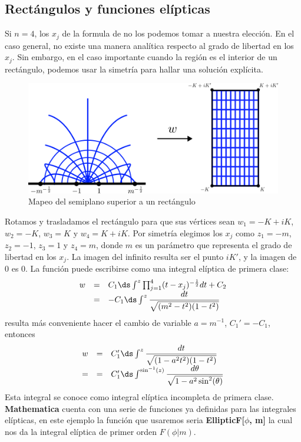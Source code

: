 \subsection{Rectángulos y funciones elípticas}
Si $n = 4$, los $x_j$ de la formula de \SC no los podemos tomar a nuestra elección. En el caso general, no existe una manera analítica respecto al grado de libertad en los $x_j$. Sin embargo, en el caso importante cuando la región es el interior de un rectángulo, podemos usar la  simetría para hallar una solución explícita.
\begin{figure}[h!]
	\centering
	\includegraphics[width=0.72\linewidth]{img/SCR}
	\caption{Mapeo del semiplano superior a un rectángulo}
	\label{fig:scr}
\end{figure}
Rotamos y trasladamos el rectángulo para que sus vértices sean $w_1=-K+iK$, $w_2=-K$, $w_3=K$ y $w_4=K+iK$. Por simetría elegimos los $x_j$ como $z_1 = -m$, 
$z_2 = -1$, $z_3 = 1$ y $z_4 = m$,  donde $m$ es un parámetro que representa el grado de libertad en los $x_j$. La imagen del infinito resulta ser  el punto $iK'$, y la imagen de $0$ es $0$. La función puede escribirse como una integral elíptica de primera clase:
\[
	\begin{array}{ccl}
		w&=&C_1\ds\int_{}^{z}\prod_{j=1}^{4}(t-x_j)^{-\frac{1}{2}}dt+C_2\\
		&=&-C_1\ds\int_{}^{z}\dfrac{dt}{\sqrt{(m^{2}-t^2)(1-t^2)}}
	\end{array}
\]
resulta más conveniente hacer el cambio de variable $a=m^{-1}$, $C_1'=-C_1$, entonces 
\[
	\begin{array}{ccl}
		w&=&C_1'\ds\int_{}^{z}\dfrac{dt}{\sqrt{(1-a^2t^2)(1-t^2)}}\\
		=&=&C_1'\ds\int_{}^{\sin^{-1}(z)}\dfrac{d\theta}{\sqrt{1-a^2\sin^2(\theta)}}
	\end{array}
\]
Esta integral se conoce como integral elíptica incompleta de primera clase. \textbf{Mathematica} cuenta con una serie de funciones ya definidas para las integrales elípticas, en este ejemplo la función que usaremos seria \textbf{EllipticF[$\phi$, m]} la cual nos da la integral elíptica de primer orden $F(\phi|m)$.\\

